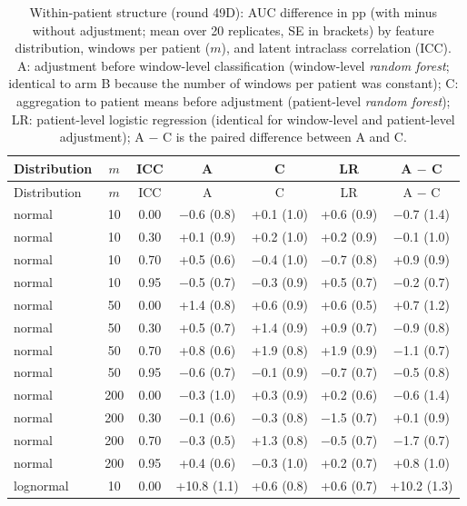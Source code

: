 {\scriptsize
\setlength{\tabcolsep}{3pt}
\begin{longtable}{lcccccc}
\caption{Within-patient structure (round 49D): AUC difference in pp (with minus without adjustment; mean over 20 replicates, SE in brackets) by feature distribution, windows per patient ($m$), and latent intraclass correlation (ICC). A: adjustment before window-level classification (window-level \textit{random forest}; identical to arm B because the number of windows per patient was constant); C: aggregation to patient means before adjustment (patient-level \textit{random forest}); LR: patient-level logistic regression (identical for window-level and patient-level adjustment); A $-$ C is the paired difference between A and C.}\label{tab:s2_struktur}\\
\toprule
Distribution & $m$ & ICC & A & C & LR & A $-$ C \\
\midrule
\endfirsthead
\toprule
Distribution & $m$ & ICC & A & C & LR & A $-$ C \\
\midrule
\endhead
\bottomrule
\endfoot
normal & 10 & 0.00 & $-$0.6 (0.8) & +0.1 (1.0) & +0.6 (0.9) & $-$0.7 (1.4) \\
normal & 10 & 0.30 & +0.1 (0.9) & +0.2 (1.0) & +0.2 (0.9) & $-$0.1 (1.0) \\
normal & 10 & 0.70 & +0.5 (0.6) & $-$0.4 (1.0) & $-$0.7 (0.8) & +0.9 (0.9) \\
normal & 10 & 0.95 & $-$0.5 (0.7) & $-$0.3 (0.9) & +0.5 (0.7) & $-$0.2 (0.7) \\
normal & 50 & 0.00 & +1.4 (0.8) & +0.6 (0.9) & +0.6 (0.5) & +0.7 (1.2) \\
normal & 50 & 0.30 & +0.5 (0.7) & +1.4 (0.9) & +0.9 (0.7) & $-$0.9 (0.8) \\
normal & 50 & 0.70 & +0.8 (0.6) & +1.9 (0.8) & +1.9 (0.9) & $-$1.1 (0.7) \\
normal & 50 & 0.95 & $-$0.6 (0.7) & $-$0.1 (0.9) & $-$0.7 (0.7) & $-$0.5 (0.8) \\
normal & 200 & 0.00 & $-$0.3 (1.0) & +0.3 (0.9) & +0.2 (0.6) & $-$0.6 (1.4) \\
normal & 200 & 0.30 & $-$0.1 (0.6) & $-$0.3 (0.8) & $-$1.5 (0.7) & +0.1 (0.9) \\
normal & 200 & 0.70 & $-$0.3 (0.5) & +1.3 (0.8) & $-$0.5 (0.7) & $-$1.7 (0.7) \\
normal & 200 & 0.95 & +0.4 (0.6) & $-$0.3 (1.0) & +0.2 (0.7) & +0.8 (1.0) \\
lognormal & 10 & 0.00 & +10.8 (1.1) & +0.6 (0.8) & +0.6 (0.7) & +10.2 (1.3) \\

\end{longtable}}

